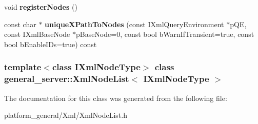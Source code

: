 \begin{DoxyCompactItemize}
\item 
\hypertarget{classgeneral__server_1_1XmlNodeList_afdf7e09ed8d61207dade15ba09feef5b}{void {\bfseries register\-Nodes} ()}\label{classgeneral__server_1_1XmlNodeList_afdf7e09ed8d61207dade15ba09feef5b}

\item 
\hypertarget{classgeneral__server_1_1XmlNodeList_ae74c726f59625c7dc6de34a75134a88c}{const char $\ast$ {\bfseries unique\-X\-Path\-To\-Nodes} (const \-I\-Xml\-Query\-Environment $\ast$p\-Q\-E, const \-I\-Xml\-Base\-Node $\ast$p\-Base\-Node=0, const bool b\-Warn\-If\-Transient=true, const bool b\-Enable\-I\-Ds=true) const }\label{classgeneral__server_1_1XmlNodeList_ae74c726f59625c7dc6de34a75134a88c}

\end{DoxyCompactItemize}
\subsubsection*{template$<$class \-I\-Xml\-Node\-Type$>$ class general\-\_\-server\-::\-Xml\-Node\-List$<$ I\-Xml\-Node\-Type $>$}



\-The documentation for this class was generated from the following file\-:\begin{DoxyCompactItemize}
\item 
platform\-\_\-general/\-Xml/\-Xml\-Node\-List.\-h\end{DoxyCompactItemize}
